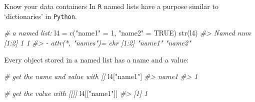\documentclass[
  11pt,
  ignorenonframetext,
  svgnames, handout, t]{beamer}
\newenvironment{Shaded}{\begin{snugshade}}{\end{snugshade}}
\newcommand{\CommentTok}[1]{\textcolor[rgb]{0.56,0.35,0.01}{\textit{#1}}}
\newcommand{\ConstantTok}[1]{\textcolor[rgb]{0.00,0.00,0.00}{#1}}
\newcommand{\DecValTok}[1]{\textcolor[rgb]{0.00,0.00,0.81}{#1}}
\newcommand{\FunctionTok}[1]{\textcolor[rgb]{0.00,0.00,0.00}{#1}}
\newcommand{\NormalTok}[1]{#1}
\newcommand{\OtherTok}[1]{\textcolor[rgb]{0.56,0.35,0.01}{#1}}
\newcommand{\StringTok}[1]{\textcolor[rgb]{0.31,0.60,0.02}{#1}}
\begin{document}
\begin{frame}[fragile]{Know your data containers}
\protect\hypertarget{know-your-data-containers-1}{}
In \texttt{R} named lists have a purpose similar to `dictionaries' in
\texttt{Python}.

\footnotesize

\begin{Shaded}
\begin{Highlighting}[]
\CommentTok{\# a named list:}
\NormalTok{l4 }\OtherTok{=} \FunctionTok{c}\NormalTok{(}\StringTok{"name1"} \OtherTok{=} \DecValTok{1}\NormalTok{, }\StringTok{"name2"} \OtherTok{=} \ConstantTok{TRUE}\NormalTok{)}
\FunctionTok{str}\NormalTok{(l4)}
\CommentTok{\#\textgreater{}  Named num [1:2] 1 1}
\CommentTok{\#\textgreater{}  {-} attr(*, "names")= chr [1:2] "name1" "name2"}
\end{Highlighting}
\end{Shaded}

\normalsize

Every object stored in a named list has a name and a value:

\footnotesize

\begin{Shaded}
\begin{Highlighting}[]
\CommentTok{\# get the name and value with []}
\NormalTok{l4[}\StringTok{"name1"}\NormalTok{]}
\CommentTok{\#\textgreater{} name1 }
\CommentTok{\#\textgreater{}     1}

\CommentTok{\# get the value with [[]]}
\NormalTok{l4[[}\StringTok{"name1"}\NormalTok{]]}
\CommentTok{\#\textgreater{} [1] 1}
\end{Highlighting}
\end{Shaded}

\normalsize
\end{frame}
\end{document}
